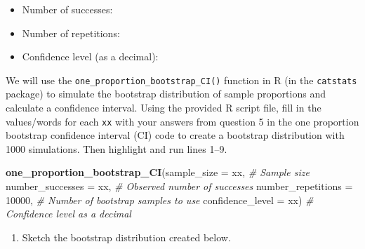\documentclass[
]{report}
\newenvironment{Shaded}{\begin{snugshade}}{\end{snugshade}}
\newcommand{\AttributeTok}[1]{\textcolor[rgb]{0.13,0.29,0.53}{#1}}
\newcommand{\CommentTok}[1]{\textcolor[rgb]{0.56,0.35,0.01}{\textit{#1}}}
\newcommand{\DecValTok}[1]{\textcolor[rgb]{0.00,0.00,0.81}{#1}}
\newcommand{\FunctionTok}[1]{\textcolor[rgb]{0.13,0.29,0.53}{\textbf{#1}}}
\newcommand{\NormalTok}[1]{#1}
\providecommand{\tightlist}{%
  \setlength{\itemsep}{0pt}\setlength{\parskip}{0pt}}
\begin{document}
\begin{itemize}
\tightlist
\item
  Number of successes:
\end{itemize}

\vspace{.1in}

\begin{itemize}
\tightlist
\item
  Number of repetitions:
\end{itemize}

\vspace{.1in}

\begin{itemize}
\tightlist
\item
  Confidence level (as a decimal):
\end{itemize}

\vspace{.1in}

We will use the \texttt{one\_proportion\_bootstrap\_CI()} function in R (in the \texttt{catstats} package) to simulate the bootstrap distribution of sample proportions and calculate a confidence interval. Using the provided R script file, fill in the values/words for each \texttt{xx} with your answers from question 5 in the one proportion bootstrap confidence interval (CI) code to create a bootstrap distribution with 1000 simulations. Then highlight and run lines 1--9.

\begin{Shaded}
\begin{Highlighting}[]
\FunctionTok{one\_proportion\_bootstrap\_CI}\NormalTok{(}\AttributeTok{sample\_size =}\NormalTok{ xx, }\CommentTok{\# Sample size}
                    \AttributeTok{number\_successes =}\NormalTok{ xx, }\CommentTok{\# Observed number of successes}
                    \AttributeTok{number\_repetitions =} \DecValTok{10000}\NormalTok{, }\CommentTok{\# Number of bootstrap samples to use}
                    \AttributeTok{confidence\_level =}\NormalTok{ xx) }\CommentTok{\# Confidence level as a decimal}
\end{Highlighting}
\end{Shaded}

\newpage

\begin{enumerate}
\def\labelenumi{\arabic{enumi}.}
\setcounter{enumi}{7}
\tightlist
\item
  Sketch the bootstrap distribution created below.
\end{enumerate}
\end{document}
